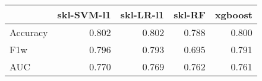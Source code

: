 \begin{tabular}{lrrrr}
\toprule
{} &  skl-SVM-l1 &  skl-LR-l1 &  skl-RF &  xgboost \\
\midrule
Accuracy &       0.802 &      0.802 &   0.788 &    0.800 \\
F1w      &       0.796 &      0.793 &   0.695 &    0.791 \\
AUC      &       0.770 &      0.769 &   0.762 &    0.761 \\
\bottomrule
\end{tabular}
